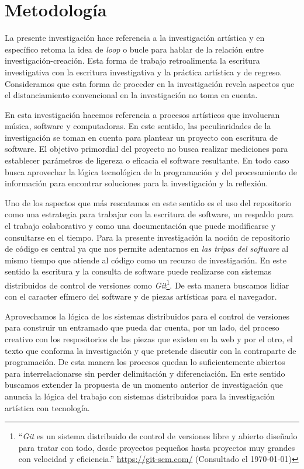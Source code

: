 \section*{Metodología}


La presente investigación hace referencia a la investigación artística y en específico retoma la idea de \textit{loop} o bucle para hablar de la relación entre investigación-creación. Esta forma de trabajo retroalimenta la escritura investigativa con la escritura investigativa y la práctica artística y de regreso. Consideramos que esta forma de proceder en la investigación revela aspectos que el distanciamiento convencional en la investigación no toma en cuenta.

En esta investigación hacemos referencia a procesos artísticos que involucran música, software y computadoras. En este sentido, las peculiaridades de la investigación se toman en cuenta para plantear un proyecto con escritura de software. El objetivo primordial del proyecto no busca realizar mediciones para establecer parámetros de ligereza o eficacia el software resultante. En todo caso busca aprovechar la lógica tecnológica de la programación y del procesamiento de información para encontrar soluciones para la investigación y la reflexión.

Uno de los aspectos que más rescatamos en este sentido es el uso del repositorio como una estrategia para trabajar con la escritura de software, un respaldo para el trabajo colaborativo y como una documentación que puede modificarse y consultarse en el tiempo. Para la presente investigación la noción de repositorio de código es central ya que nos permite adentarnos en \textit{las tripas del software} al mismo tiempo que atiende al código como un recurso de investigación. En este sentido la escritura y la consulta de software puede realizarse con sistemas distribuidos de control de versiones como \textit{Git}\footnote{``\textit{Git} es un sistema distribuido de control de versiones libre y abierto diseñado para tratar con todo, desde proyectos pequeños hasta proyectos muy grandes con velocidad y eficiencia.'' \url{https://git-scm.com/} (Consultado el \today)}. De esta manera buscamos lidiar con el caracter efímero del software y de piezas artísticas para el navegador. 

Aprovechamos la lógica de los sistemas distribuidos para el control de versiones para construir un entramado que pueda dar cuenta, por un lado, del proceso creativo con los respositorios de las piezas que existen en la web y por el otro, el texto que conforma la investigación y que pretende discutir con la contraparte de programación. De esta manera los procesos quedan lo suficientemente abiertos para interrelacionarse sin perder delimitación y diferenciación. En este sentido buscamos extender la propuesta de un momento anterior de investigación que anuncia la lógica del trabajo con sistemas distribuidos para la investigación artística con tecnología.

